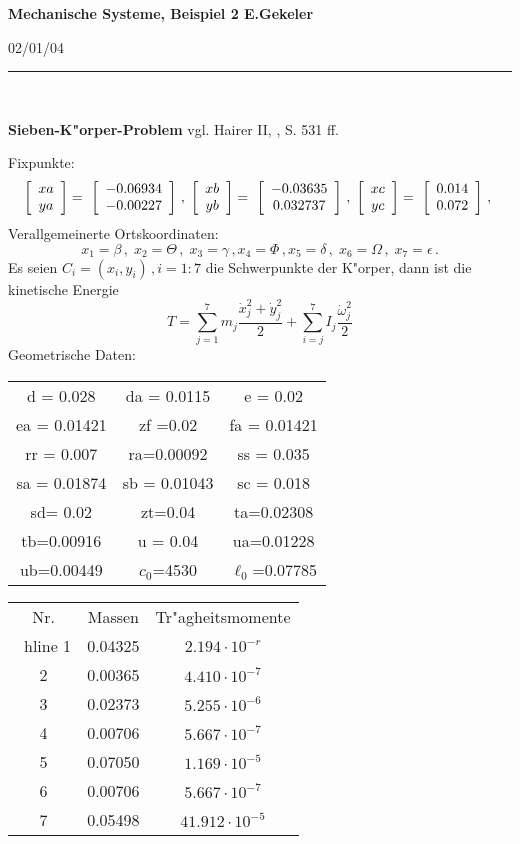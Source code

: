 \documentclass[12pt,a4paper,twoside,leqno]{article}
\newcommand{\Release}{02/01/04} %
\begin{document}
%
\addtolength{\abovedisplayshortskip}{-1ex}
\setlength{\fboxsep}{1ex}
%
{\large\bf Mechanische Systeme, Beispiel 2 \hfill E.Gekeler}
\par
\vspace{-1mm}
\hfill{\footnotesize\Release\ }
\par
\vspace{-2mm}
\rule{\textwidth}{1pt}\\
\par
\vspace{-3mm}
{\bf Sieben-K"orper-Problem} vgl. {\sc Hairer} II, , S. 531 ff.
\par
Fixpunkte:
\[
\ba{[}{c}xa\\ya\ea{]} = \ \ba{[}{c} - 0.06934\\-0.00227\ea{]}\,,\;
%
\ba{[}{c}xb\\yb\ea{]} = \ \ba{[}{c} - 0.03635\\0.032737\ea{]}\,,\;
\ba{[}{c}xc\\yc\ea{]} = \ \ba{[}{c} 0.014\\0.072\ea{]}\,,\;
\]
Verallgemeinerte Ortskoordinaten:
\[
x_1 = \beta\,,\; x_2 = \Theta\,,\; x_3 = \gamma\,, x_4 = \Phi\,,
x_5 = \delta\,,\; x_6 = \Omega\,,\; x_7 = \epsilon\,.
\]
Es seien $C_i = (x_i,y_i)\,, i = 1:7$ die Schwerpunkte der K"orper,
dann ist die kinetische Energie
\[
T = \sum_{j=1}^7m_j\frac{\dot{x}^2_j + \dot{y}^2_j}{2}
+ \sum_{i=j}^7I_j\frac{\dot{\omega}^2_j}{2}
\]
Geometrische Daten:
\bc
\renewcommand{\arraystretch}{1.5}

\begin{tabular}{|c|c|c|}\hline
d = 0.028    & da = 0.0115  & e = 0.02\\
ea = 0.01421 & zf =0.02     & fa = 0.01421\\
rr = 0.007   & ra=0.00092   & ss = 0.035\\
sa = 0.01874 & sb = 0.01043 & sc = 0.018\\
sd= 0.02     & zt=0.04      & ta=0.02308\\
tb=0.00916   & u = 0.04     & ua=0.01228\\
ub=0.00449   & $c_0$=4530   & $\ell_0$=0.07785 \\ \hline
\end{tabular}
\ec
%
\bc
\renewcommand{\arraystretch}{1.5}
\begin{tabular}{|c|c|c|} \hline
Nr. & Massen & Tr"agheitsmomente\\ \ hline
1 & 0.04325 & $2.194\cdot 10^{-r}$\\
2 & 0.00365 & $4.410\cdot 10^{-7}$\\
3 & 0.02373 & $5.255\cdot 10^{-6}$\\
4 & 0.00706 & $5.667\cdot 10^{-7}$\\
5 & 0.07050 & $1.169\cdot 10^{-5}$\\
6 & 0.00706 & $5.667\cdot 10^{-7}$\\
7 & 0.05498 & $41.912\cdot 10^{-5}$\\ \hline
\end{tabular}
\ec
\end{document}
